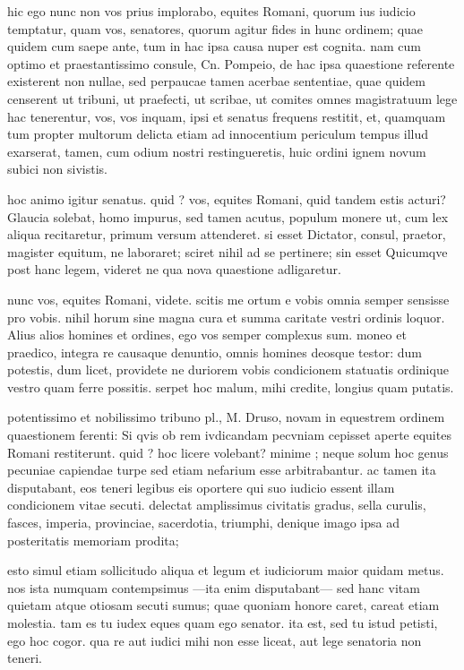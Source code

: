  hic ego nunc non vos prius implorabo, equites Romani, quorum ius iudicio temptatur, quam vos, senatores, quorum agitur fides in hunc ordinem; quae quidem cum saepe ante, tum in hac ipsa causa nuper est cognita. nam cum optimo et praestantissimo consule, Cn. Pompeio, de hac ipsa quaestione referente existerent non nullae, sed perpaucae tamen acerbae sententiae, quae quidem censerent ut tribuni, ut praefecti, ut scribae, ut comites omnes magistratuum lege hac tenerentur, vos, vos inquam, ipsi et senatus frequens restitit, et, quamquam tum propter multorum delicta etiam ad innocentium periculum tempus illud exarserat, tamen, cum odium nostri restingueretis, huic ordini ignem novum subici non sivistis.

 hoc animo igitur senatus. quid ? vos, equites Romani, quid tandem estis acturi? Glaucia solebat, homo impurus, sed tamen acutus, populum monere ut, cum lex aliqua recitaretur, primum versum attenderet. si esset Dictator, consul, praetor, magister equitum, ne laboraret; sciret nihil ad se pertinere; sin esset Quicumqve post hanc legem, videret ne qua nova quaestione adligaretur.

 nunc vos, equites Romani, videte. scitis me ortum e vobis omnia semper sensisse pro vobis. nihil horum sine magna cura et summa caritate vestri ordinis loquor. Alius alios homines et ordines, ego vos semper complexus sum. moneo et praedico, integra re causaque denuntio, omnis homines deosque testor: dum potestis, dum licet, providete ne duriorem vobis condicionem statuatis ordinique vestro quam ferre possitis. serpet hoc malum, mihi credite, longius quam putatis.

 potentissimo et nobilissimo tribuno pl., M. Druso, novam in equestrem ordinem quaestionem ferenti: Si qvis ob rem ivdicandam pecvniam cepisset aperte equites Romani restiterunt. quid ? hoc licere volebant? minime ; neque solum hoc genus pecuniae capiendae turpe sed etiam nefarium esse arbitrabantur. ac tamen ita disputabant, eos teneri legibus eis oportere qui suo iudicio essent illam condicionem vitae secuti. delectat amplissimus civitatis gradus, sella curulis, fasces, imperia, provinciae, sacerdotia, triumphi, denique imago ipsa ad posteritatis memoriam prodita;

 esto simul etiam sollicitudo aliqua et legum et iudiciorum maior quidam metus. nos ista numquam contempsimus —ita enim disputabant— sed hanc vitam quietam atque otiosam secuti sumus; quae quoniam honore caret, careat etiam molestia. tam es tu iudex eques quam ego senator. ita est, sed tu istud petisti, ego hoc cogor. qua re aut iudici mihi non esse liceat, aut lege senatoria non teneri.

